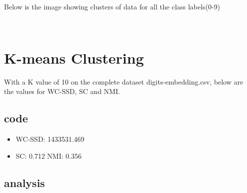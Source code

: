 \documentclass[11pt]{article}
\begin{document}
    \begin{center}
    \end{center}
    { \hspace*{\fill} \\}
    
    \begin{center}
    \end{center}
    { \hspace*{\fill} \\}
    
    \begin{center}
    \end{center}
    { \hspace*{\fill} \\}
    
    \begin{center}
    \end{center}
    { \hspace*{\fill} \\}
    
    Below is the image showing clusters of data for all the class
labels(0-9)

       \begin{center}
    \end{center}
    { \hspace*{\fill} \\}
   \section{K-means Clustering}
    With a K value of 10 on the complete dataset digits-embedding.csv, below
are the values for WC-SSD, SC and NMI.\\
\subsection{code}
\begin{itemize}
\item WC-SSD: 1433531.469 
\item SC: 0.712 NMI: 0.356
\end{itemize}
\subsection{analysis}
\end{document}
